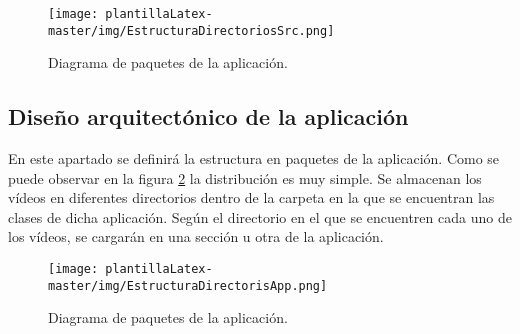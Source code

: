\begin{figure}[H]
    \centering
    \texttt{[image: plantillaLatex-master/img/EstructuraDirectoriosSrc.png]}
    \caption{Diagrama de paquetes de la aplicación.}
    \label{fig:EstructuraDirectoriosSrc}
\end{figure}

\subsection{Diseño arquitectónico de la aplicación}
En este apartado se definirá la estructura en paquetes de la aplicación. Como se puede observar en la figura \ref{fig:EstructuraDirectorisApp} la distribución es muy simple. Se almacenan los vídeos en diferentes directorios dentro de la carpeta en la que se encuentran las clases de dicha aplicación. Según el directorio en el que se encuentren cada uno de los vídeos, se cargarán en una sección u otra de la aplicación.

\begin{figure}[H]
    \centering
    \texttt{[image: plantillaLatex-master/img/EstructuraDirectorisApp.png]}
    \caption{Diagrama de paquetes de la aplicación.}
    \label{fig:EstructuraDirectorisApp}
\end{figure}

